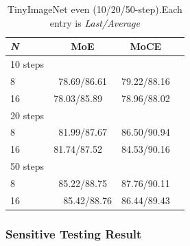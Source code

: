 \documentclass{article}
\theoremstyle{definition}
\theoremstyle{remark}
\begin{document}
\begin{table}[H]
\centering
\scriptsize
\setlength{\tabcolsep}{10pt}

\label{tab:tinyimagenet_even_n8and16_ieee}
\begin{tabular}{lccc}
\toprule
\textit{\textbf{N}} & MoE & MoCE \\
\midrule
10 steps & & \\
\midrule
8& 78.69/86.61 & 79.22/88.16 \\
16& 78.03/85.89  & 78.96/88.02 \\

\midrule
20 steps & & \\
\midrule

8 & 81.99/87.67 & 86.50/90.94 \\


16& 81.74/87.52  & 84.53/90.16 \\

\midrule
50 steps & &\\
\midrule

8 & 85.22/88.75 & 87.76/90.11\\


16&  85.42/88.76 & 86.44/89.43\\

 \bottomrule
\end{tabular}
\vspace{1mm}

\caption{TinyImageNet even (10/20/50-step).Each entry is \textit{Last/Average}}
\footnotesize

\end{table}

\subsubsection{Sensitive Testing Result}
\end{document}
